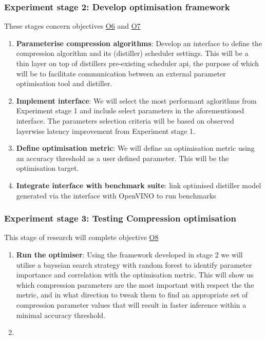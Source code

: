 \documentclass[../D1.tex]{subfiles}
\begin{document}
\subsubsection{Experiment stage 2: Develop optimisation framework}\label{sec:Experiment2}
These stages concern objectives \hyperref[obj:ParaSel]{O6} and \hyperref[obj:CompPara]{O7}
\begin{enumerate}
    \item \textbf{Parameterise compression algorithms}: Develop an interface to define the compression algorithm and its (distiller) scheduler settings. This will be a thin layer on top of distillers pre-existing scheduler api, the purpose of which will be to facilitate communication between an external parameter optimisation tool and distiller.
    \item \textbf{Implement interface}: We will select the most performant aglorithms from Experiment stage 1 and include select parameters in the aforementioned interface. The parameters selection criteria will be based on observed layerwise latency improvement from Experiment stage 1.
    \item \textbf{Define optimisation metric}: We will define an optimisation metric using an accuracy threshold as a user defined parameter. This will be the optimisation target.
    \item \textbf{Integrate interface with benchmark suite}: link optimised distiller model generated via the interface with OpenVINO to run benchmarks
\end{enumerate}

\subsubsection{Experiment stage 3: Testing Compression optimisation}\label{sec:Experiment3}
This stage of research will complete objective \hyperref[obj:TestOpt]{O8}
\begin{enumerate}
    \item \textbf{Run the optimiser}: Using the framework developed in stage 2 we will utilise a bayseian search strategy with random forest to identify parameter importance and correlation with the optimisation metric. This will show us which compression parameters are the most important with respect the the metric, and in what direction to tweak them to find an appropriate set of compression parameter values that will result in faster inference within a minimal accuracy threshold.
    \item 
\end{enumerate}
\end{document}
